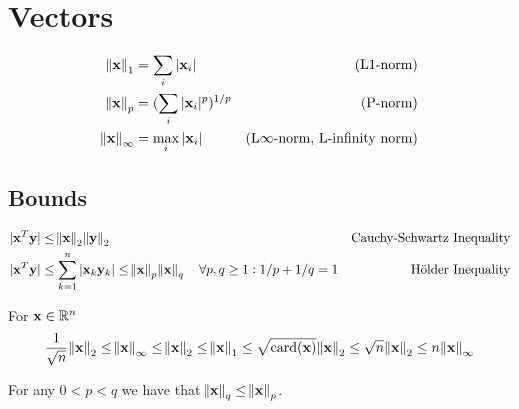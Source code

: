\section{Vectors}

\begin{align}
\norm{\vx}_1      &= \sum_i |\vx_i| & \textrm{(L1-norm\index{L1-norm})} \\
\norm{\vx}_p      &= (\sum_i |\vx_i|^p)^{1/p} & \textrm{(P-norm\index{P-norm})} \\
\norm{\vx}_\infty &= \max_i |\vx_i| & \textrm{(L$\infty$-norm\index{L$\infty$-norm}, L-infinity norm)}
\end{align}


\subsection{Bounds}

\begin{align}
|\mathbf{x}^T \mathbf{y}| &\le \norm{\mathbf{x}}_2 \norm{\mathbf{y}}_2 & \textrm{Cauchy-Schwartz Inequality} \\
|\mathbf{x}^T \mathbf{y}| &\le \sum_{k=1}^n |\mathbf{x}_k \mathbf{y}_k| \le \norm{\mathbf{x}}_p \norm{\mathbf{x}}_q~~~\forall p,q\ge1: 1/p+1/q=1 & \textrm{H\"older Inequality}
\end{align}

For $\mathbf{x}\in\mathbb{R}^n$
\begin{equation}
\frac{1}{\sqrt{n}}\norm{\mathbf{x}}_2
\le\norm{\mathbf{x}}_\infty
\le\norm{\mathbf{x}}_2
\le\norm{\mathbf{x}}_1
\le\sqrt{\textrm{card}(\mathbf{x})}\norm{\mathbf{x}}_2
\le\sqrt{n}\norm{\mathbf{x}}_2
\le n \norm{\mathbf{x}}_\infty
\end{equation}

For any $0<p<q$ we have that $\norm{\mathbf{x}}_q\le\norm{\mathbf{x}}_p$.